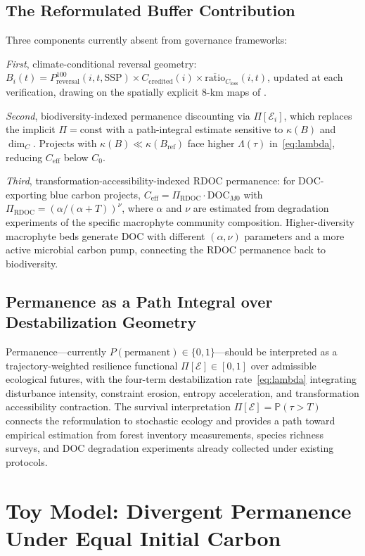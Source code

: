 \documentclass[12pt]{article}
\newcommand{\Ecal}{\mathcal{E}}
\newcommand{\kref}{\kappa(B_{\mathrm{ref}})}
\begin{document}
\subsection{The Reformulated Buffer Contribution}

Three components currently absent from governance frameworks:

\textit{First}, climate-conditional reversal geometry: $B_i(t) = P^{100}_\text{reversal}
(i,t,\text{SSP})\times C_\text{credited}(i)\times\overline{\text{ratio}}_{C_\text{loss}}
(i,t)$, updated at each verification, drawing on the spatially explicit 8-km maps of
\citet{Wu2026}.

\textit{Second}, biodiversity-indexed permanence discounting via $\Pi[\Ecal_i]$, which
replaces the implicit $\Pi=\text{const}$ with a path-integral estimate sensitive to
$\kappa(B)$ and $\dim_C$. Projects with $\kappa(B)\ll\kref$ face higher $\Lambda(\tau)$
in~\eqref{eq:lambda}, reducing $C_\text{eff}$ below $C_0$.

\textit{Third}, transformation-accessibility-indexed RDOC permanence: for DOC-exporting
blue carbon projects, $C_\text{eff}=\Pi_\text{RDOC}\cdot\text{DOC}_{M0}$ with
$\Pi_\text{RDOC}=(\alpha/(\alpha+T))^\nu$, where $\alpha$ and $\nu$ are estimated from
degradation experiments of the specific macrophyte community composition. Higher-diversity
macrophyte beds generate DOC with different $(\alpha,\nu)$ parameters and a more active
microbial carbon pump, connecting the RDOC permanence back to biodiversity.

\subsection{Permanence as a Path Integral over Destabilization Geometry}

Permanence---currently $P(\text{permanent})\in\{0,1\}$---should be interpreted as a
trajectory-weighted resilience functional $\Pi[\Ecal]\in[0,1]$ over admissible ecological
futures, with the four-term destabilization rate~\eqref{eq:lambda} integrating disturbance
intensity, constraint erosion, entropy acceleration, and transformation accessibility
contraction. The survival interpretation $\Pi[\Ecal]=\mathbb{P}(\tau>T)$ connects the
reformulation to stochastic ecology \citep{Levin1998} and provides a path toward empirical
estimation from forest inventory measurements, species richness surveys, and DOC
degradation experiments already collected under existing protocols.

\section{Toy Model: Divergent Permanence Under Equal Initial Carbon}
\end{document}
